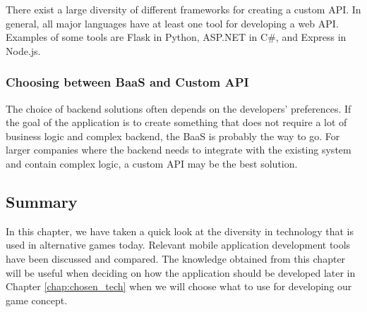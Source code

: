 \documentclass[../Main.tex]{subfiles}
\begin{document}
There exist a large diversity of different frameworks for creating a custom API. In general, all major languages have at least one tool for developing a web API. Examples of some tools are Flask in Python, ASP.NET in C\#, and Express in Node.js.

\subsubsection{Choosing between BaaS and Custom API}
The choice of backend solutions often depends on the developers’ preferences. If the goal of the application is to create something that does not require a lot of business logic and complex backend, the BaaS is probably the way to go. For larger companies where the backend needs to integrate with the existing system and contain complex logic, a custom API may be the best solution. 

\subsection{Summary}
In this chapter, we have taken a quick look at the diversity in technology that is used in alternative games today. Relevant mobile application development tools have been discussed and compared. The knowledge obtained from this chapter will be useful when deciding on how the application should be developed later in Chapter \ref{chap:chosen_tech} when we will choose what to use for developing our game concept.

\biblio %
\end{document}
